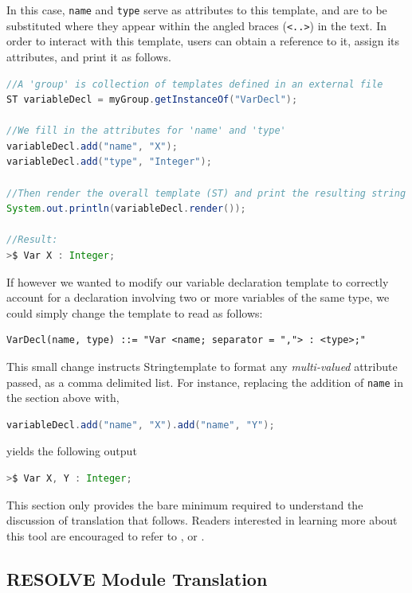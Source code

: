 \documentclass[times]{speauth}
\begin{document}
In this case, \texttt{name} and \texttt{type} serve as attributes to this template, and are to be substituted where they appear within the angled braces (\texttt{<..>}) in the text. In order to interact with this template, users can obtain a reference to it, assign its attributes, and print it as follows.

\begin{lstlisting}[language=java]
//A 'group' is collection of templates defined in an external file
ST variableDecl = myGroup.getInstanceOf("VarDecl"); 

//We fill in the attributes for 'name' and 'type'
variableDecl.add("name", "X");
variableDecl.add("type", "Integer");		     

//Then render the overall template (ST) and print the resulting string
System.out.println(variableDecl.render());

//Result:
>$ Var X : Integer;
\end{lstlisting}

If however we wanted to modify our variable declaration template to correctly account for a declaration involving two or more variables of the same type, we could simply change the template to read as follows:
\begin{lstlisting}
VarDecl(name, type) ::= "Var <name; separator = ","> : <type>;"
\end{lstlisting}

This small change instructs Stringtemplate to format any \textit{multi-valued} attribute passed, as a comma delimited list. For instance, replacing the addition of \texttt{name} in the section above with,

\begin{lstlisting}[language=java]
variableDecl.add("name", "X").add("name", "Y");
\end{lstlisting}	

yields the following output
\begin{lstlisting}[language=java]
>$ Var X, Y : Integer;
\end{lstlisting}	

This section only provides the bare minimum required to understand the discussion of translation that follows. Readers interested in learning more about this tool are encouraged to refer to \cite{parr:2004}, or \cite{parr:2006}.

\subsection{RESOLVE Module Translation}
\end{document}
